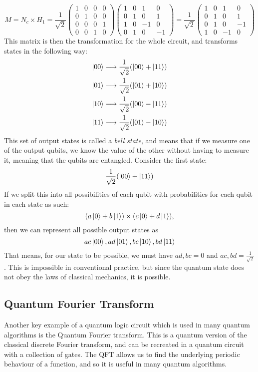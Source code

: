 $$
M = N_c\times H_1 = \frac{1}{\sqrt{2}}
\begin{pmatrix}
1 & 0 & 0 & 0\\
0 & 1 & 0 & 0\\
0 & 0 & 0 & 1\\
0 & 0 & 1 & 0
\end{pmatrix}
\begin{pmatrix}
1 & 0 & 1 & 0\\
0 & 1 & 0 & 1\\
1 & 0 & -1 & 0\\
0 & 1 & 0 & -1
\end{pmatrix} = \frac{1}{\sqrt{2}}
\begin{pmatrix}
1 & 0 & 1 & 0\\
0 & 1 & 0 & 1\\
0 & 1 & 0 & -1\\
1 & 0 & -1 & 0
\end{pmatrix}
$$
This matrix is then the transformation for the whole circuit, and transforms states in the following way:
\begin{align*}
    \ket{00} \longrightarrow \frac{1}{\sqrt{2}}(\ket{00} + \ket{11})\\
    \ket{01} \longrightarrow \frac{1}{\sqrt{2}}(\ket{01} + \ket{10})\\
    \ket{10} \longrightarrow \frac{1}{\sqrt{2}}(\ket{00} - \ket{11})\\
    \ket{11} \longrightarrow \frac{1}{\sqrt{2}}(\ket{01} - \ket{10})
\end{align*}
This set of output states is called a \emph{bell state}, and means that if we measure one of the output qubits, we know the value of the other without having to measure it, meaning that the qubits are entangled. Consider the first state: $$\frac{1}{\sqrt{2}}(\ket{00} + \ket{11})$$
If we split this into all possibilities of each qubit with probabilities for each qubit in each state as such:
$$(a\ket{0} + b\ket{1}) \times (c\ket{0} + d\ket{1}),$$
then we can represent all possible output states as
$$ac\ket{00}, ad\ket{01}, bc\ket{10}, bd\ket{11}$$
That means, for our state to be possible, we must have $ad,bc=0$ and $ac,bd=\frac{1}{\sqrt{2}}$. This is impossible in conventional practice, but since the quantum state does not obey the laws of classical mechanics, it is possible.
\subsection{Quantum Fourier Transform}
Another key example of a quantum logic circuit which is used in many quantum algorithms is the Quantum Fourier transform. This is a quantum version of the classical discrete Fourier transform, and can be recreated in a quantum circuit with a collection of gates. The QFT allows us to find the underlying periodic behaviour of a function, and so it is useful in many quantum algorithms.
